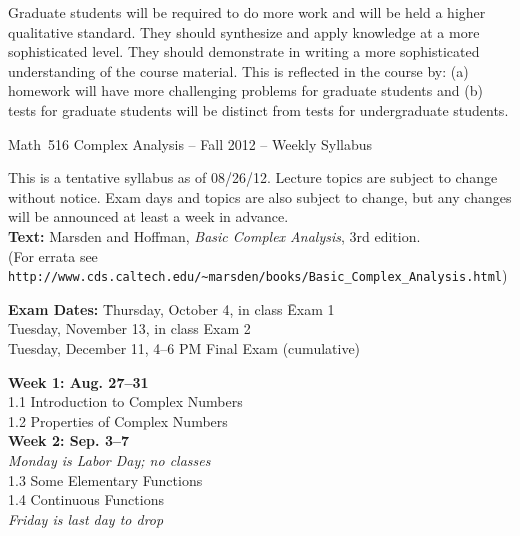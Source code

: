 \documentclass[11pt]{article}
\begin{document}
Graduate students will be required to do more work and will be held a higher
qualitative standard.  They should synthesize and apply knowledge at a
more sophisticated level.  They should
demonstrate in writing a more sophisticated understanding of the
course material.
This is reflected in the course by: (a) homework will have more challenging problems for
graduate students and (b) tests for graduate students will be distinct from tests for
undergraduate students.

\newpage
\setlength{\topmargin}{0in}
\setlength{\oddsidemargin}{0in}
\setlength{\textwidth}{6.5in}
\setlength{\textheight}{9.2in}
\setlength{\parindent}{0in}
\pagestyle{empty}

\begin{center}
\begin{bf}
\noindent
{\large Math~516 Complex Analysis -- Fall 2012 -- Weekly Syllabus}\\
\end{bf}
\end{center}

This is a tentative syllabus as of 08/26/12. Lecture topics are subject
to change without notice. Exam days and topics 
are also subject to change, but any changes will be
announced at least a week in advance.\\
  
{\bf Text:} Marsden and Hoffman, {\it
  Basic Complex Analysis}, 3rd edition.\\
(For errata see \verb|http://www.cds.caltech.edu/~marsden/books/Basic_Complex_Analysis.html|) 
 
\begin{tabbing}
{\bf Exam Dates: }
\= Thursday, October 4, in class \hspace{1in} \= Exam 1\\ 
\> Tuesday, November 13, in class  \> Exam 2\\
\> Tuesday, December 11, 4--6 PM \> Final Exam (cumulative)\\
\end{tabbing}


{\bf Week 1: Aug. 27--31}\\
1.1 Introduction to Complex Numbers\\
1.2 Properties of Complex Numbers\\

{\bf Week 2: Sep. 3--7}\\ %
{\it Monday is Labor Day; no classes}\\
1.3 Some Elementary Functions\\
1.4 Continuous Functions\\
{\it Friday is last day to drop}\\
\end{document}
